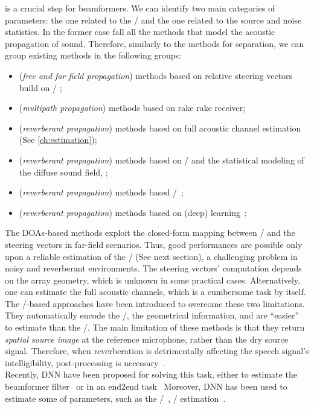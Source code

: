  is a crucial step for beamformers.
We can identify two main categories of parameters: the one related to the \RIRs/ and the one related to the source and noise statistics.
In the former case fall all the methods that model the acoustic propagation of sound.
Therefore, similarly to the methods for separation, we can group existing methods in the following groups:
\begin{itemize}
    \item (\textit{free and far field propagation}) methods based on relative steering vectors build on \DOA/ ;
    \item (\textit{multipath propagation}) methods based on rake rake receiver;
    \item (\textit{reverberant propagation}) methods based on full acoustic channel estimation (See \cref{ch:estimation});
    \item (\textit{reverberant propagation}) methods based on \DOAs/ and the statistical modeling of the diffuse sound field, ;
    \item (\textit{reverberant propagation}) methods based \ReTF/~;
    \item (\textit{reverberant propagation}) methods based on (deep) learning~;
\end{itemize}%
The \acp{DOA}-based methods exploit the closed-form mapping between \DOAs/ and the steering vectors in far-field scenarios.
Thus, good performances are possible only upon a reliable estimation of the \DOAs/ (See next section), a challenging problem in noisy and reverberant environments.
The steering vectors' computation depends on the array geometry, which is unknown in some practical cases.
Alternatively, one can estimate the full acoustic channels, which is a cumbersome task by itself.
\\The \ReTF/-based approaches have been introduced to overcome these two limitations.
They automatically encode the \RIRs/, the geometrical information, and are ``easier'' to estimate than the \RIRs/.
The main limitation of these methods is that they return \textit{spatial source image} at the reference microphone, rather than the dry source signal.
Therefore, when reverberation is detrimentally affecting the speech signal's intelligibility, post-processing is necessary~.
\\Recently, \ac{DNN} have been proposed for solving this task, either to estimate the beamformer filter~ or in an end2end task~
Moreover, \ac{DNN} has been used to estimate some of parameters, such as the \DOAs/~, \ReTF/ estimation~.

